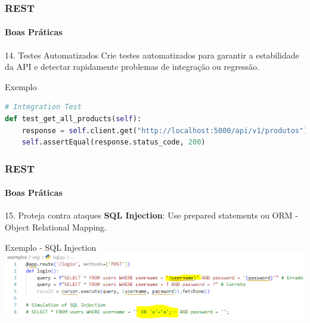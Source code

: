 \documentclass[
	9pt, %
	t, %
]{beamer}
\newcommand{\yellowbox}[1]{\colorbox{yellow!75}{#1}}
\begin{document}
\begin{frame}[fragile]
	\frametitle{REST}
	\framesubtitle{Boas Práticas}

	\begin{block}{14. Testes Automatizados}
		Crie testes automatizados para garantir a estabilidade da API e detectar rapidamente problemas de integração ou regressão.
	\end{block}

	\begin{exampleblock}{Exemplo}
		\begin{lstlisting}[language=Python, basicstyle=\small]
# Integration Test
def test_get_all_products(self):
	response = self.client.get("http://localhost:5000/api/v1/produtos")
	self.assertEqual(response.status_code, 200)
		\end{lstlisting}

	\end{exampleblock}

\end{frame}

\begin{frame}
	\frametitle{REST}
	\framesubtitle{Boas Práticas}

	\begin{block}{15. Proteja contra ataques}
		\textbf{SQL Injection}: Use \yellowbox{prepared statements} ou \yellowbox{ORM - Object Relational Mapping}.
	\end{block}

	\begin{exampleblock}{Exemplo - SQL Injection}
		\includegraphics[width=0.9\linewidth]{sql_injection.png}
	\end{exampleblock}

\end{frame}
\end{document}
